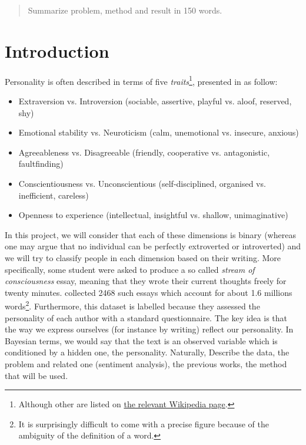 \begin{abstract}
	Summarize problem, method and result in 150 words.
\end{abstract}

\section{Introduction}
Personality is often described in terms of five \emph{traits}\footnote{Although other are listed on
\href{http://en.wikipedia.org/wiki/Trait\_theory\#List\_of\_personality\_traits}{the
relevant Wikipedia page}.}, presented in \autocite{mairesse2007perso} as follow:
\begin{itemize}
\item Extraversion vs. Introversion (sociable, assertive, playful vs. aloof, reserved, shy)
\item Emotional stability vs. Neuroticism (calm, unemotional vs. insecure, anxious)
\item Agreeableness vs. Disagreeable (friendly, cooperative vs. antagonistic, faultfinding)
\item Conscientiousness vs. Unconscientious (self-disciplined, organised vs. inefficient, careless)
\item Openness to experience (intellectual, insightful vs. shallow, unimaginative)
\end{itemize}

In this project, we will consider that each of these dimensions is binary (whereas one may argue that no individual can be perfectly extroverted or introverted) and we will try to classify people in each dimension based on their writing. More specifically, some student were asked to produce a so called \emph{stream of consciousness} essay, meaning that they wrote their current thoughts freely for twenty minutes. \Textcite{pennebaker1999corpus} collected 2468 such essays which account for about 1.6 millions words\footnote{It is surprisingly difficult to come with a precise figure because of the ambiguity of the definition of a word.}. Furthermore, this dataset is labelled because they assessed the personality of each author with a standard questionnaire. The key idea is that the way we express ourselves (for instance by writing) reflect our personality. In Bayesian terms, we would say that the text is an observed variable which is conditioned by a hidden one, the personality. Naturally, 
Describe the data, the problem and related one (sentiment analysis), the
previous works\cite{mairesse2007perso}, the method that will be used.

